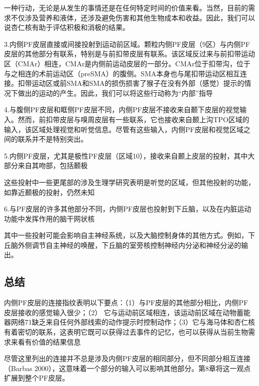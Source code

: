 一种行动，无论是从发生的事情还是在任何特定时间的价值来看。当然，目前的需求不仅涉及营养和液体，还涉及避免伤害和其他生物成本和收益。因此，我们可以说杏仁核有助于评估积极和消极的结果。\par
3.内侧PF皮层直接或间接投射到运动前区域。颗粒内侧PF皮层（9区）与内侧PF皮层的其他部分有联系，特别是与前扣带皮层有联系\cite{Vogt&Pandya 1987}。该区域反过来与前扣带运动区（CMAr）相连，CMAr是内侧前运动皮层的一部分\cite{Morecraft&VanHoesen,1998}。CMAr位于扣带沟\cite{Dum&Strick,2002年}，位于与之相连的术前运动区（preSMA）的腹侧\cite{Luppino等人,1993年}。SMA本身也与尾扣带运动区相互连接\cite{Luppino等人,1993年}。扣带运动区或前SMA和SMA的损伤损害了猴子在没有外部（感觉）提示的情况下做出的运动的产生\cite{Thaler等人,1995年}。因此，我们可以将这些行动称为“内部”指导\par
4.与腹侧PF皮层和眶侧PF皮层不同，内侧PF皮层不接收来自颞下皮层的视觉输入\cite{Carmichael&Price 1995b;Kondo等人2005}。然而，前扣带皮层与嗅周皮层有一些联系，它也接收来自颞上沟TPO区域的输入\cite{Kondo等人,2005年}，该区域处理视觉和听觉信息。尽管有这些输入，内侧PF皮层和视觉区域之间的联系并不是特别突出。\par
5.内侧PF皮层，尤其是极性PF皮层（区域10），接收来自颞上皮层的投射，其中大部分来自其吻部，包括颞极\cite{Barbas等人1999;Kondo等人2003}\par
这些投射中一些更尾部的涉及生理学研究表明是听觉的区域\cite{Hackett et al 1998}，但其他投射的功能，如靠近颞极的投射，仍然未知\par
6.与PF皮层的许多其他部分不同，内侧PF皮层也投射到下丘脑\cite{Rempel-Clower&Barbas,1998年}，以及在内脏运动功能中发挥作用的脑干网状核\cite{Öngür等人,1998年;Barbas等人,2003年}\par
其中一些投射可能会影响自主神经系统，以及大脑控制身体的其他方式。例如，下丘脑外侧调节自主神经的唤醒，下丘脑的室旁核控制神经内分泌和神经分泌的输出。\par
\subsection{总结}
内侧PF皮层的连接指纹表明以下要点：（1）与PF皮层的其他部分相比，内侧PF皮层接收的感觉输入很少；（2） 它与运动前区域相连，该运动前区域在动物蓄能器网络71缺乏来自任何外部线索的动作提示时控制动作；（3）它与海马体和杏仁核有着密切的联系，这表明它既可以获得过去事件的记忆，也可以获得从当前生物需求来看有价值的结果信息\par
尽管这里列出的连接并不总是涉及内侧PF皮层的相同部分，但不同部分相互连接（Barbas 2000），这意味着一个部分的输入可以影响其他部分。第8章将这一观点扩展到整个PF皮层。\par
